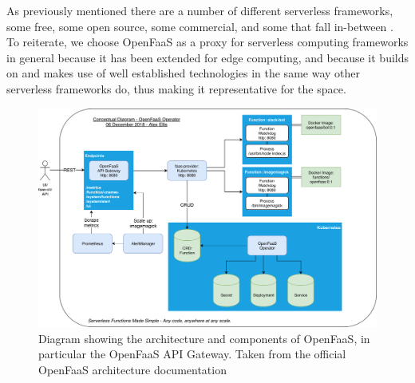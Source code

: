 \documentclass[draft,final]{vutinfth} %
\begin{document}
As previously mentioned there are a number of different serverless frameworks, some free, some open source, some commercial, and some that fall in-between\cite{aws-lambda}\cite{azure-functions} \cite{openfaas-gateway}\cite{kubeless}\cite{openwhisk}.
To reiterate, we choose OpenFaaS as a proxy for serverless computing frameworks in general because it has been extended for edge computing, and because it builds on and makes use of well established technologies in the same way other serverless frameworks do\cite{kubeless}\cite{openwhisk}, thus making it representative for the space.


\begin{figure}
    \centering
    \includegraphics[width=14cm]{graphics/diagrams/openfaas-gateway-architecture.png}
    \caption{Diagram showing the architecture and components of OpenFaaS, in particular the OpenFaaS API Gateway. Taken from the official OpenFaaS architecture documentation\cite{openfaas-gateway}}
    \label{fig:openfaas-gateway-diagram}
\end{figure}
\end{document}
